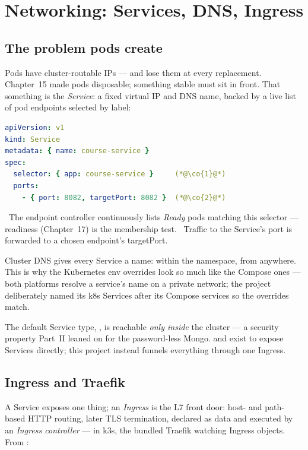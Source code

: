 \chapter{Networking: Services, DNS, Ingress}
\label{ch:networking}

\section{The problem pods create}

Pods have cluster-routable IPs --- and lose them at every replacement.
Chapter~15 made pods disposable; something stable must sit in front.
That something is the \emph{Service}: a fixed virtual IP and DNS name,
backed by a live list of pod endpoints selected by label:

\begin{lstlisting}[language=yaml]
apiVersion: v1
kind: Service
metadata: { name: course-service }
spec:
  selector: { app: course-service }     (*@\co{1}@*)
  ports:
    - { port: 8082, targetPort: 8082 }  (*@\co{2}@*)
\end{lstlisting}

~The endpoint controller continuously lists \emph{Ready} pods
matching this selector --- readiness (Chapter~17) is the membership
test. ~Traffic to the Service's port is forwarded to a chosen
endpoint's targetPort.

Cluster DNS gives every Service a name:  within
the namespace,  from
anywhere. This is why the Kubernetes env overrides look so much like
the Compose ones --- both platforms resolve a service's name on a
private network; the project deliberately named its k8s Services after
its Compose services so the overrides match.

The default Service type, , is reachable \emph{only
inside} the cluster --- a security property Part~II leaned on for the
password-less Mongo.  and  exist to
expose Services directly; this project instead funnels everything
through one Ingress.

\section{Ingress and Traefik}

A Service exposes one thing; an \emph{Ingress} is the L7 front door:
host- and path-based HTTP routing, later TLS termination, declared as
data and executed by an \emph{Ingress controller} --- in k3s, the
bundled Traefik watching Ingress objects. From
:

